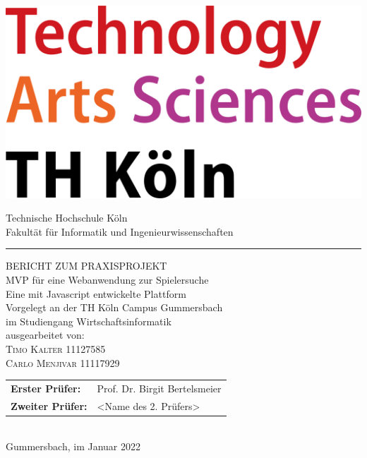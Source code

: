\documentclass[a4paper,12pt,oneside]{article}
\begin{document}
\pagestyle{empty} %
\newpage %

\pagestyle{empty}
\begin{titlepage}
  \includegraphics[scale=0.20]{sources/TH_Koeln_Logo}\\
  \begin{center}
    \Large
    Technische Hochschule Köln\\
    Fakultät für Informatik und Ingenieurwissenschaften\\
    \hrule\par\rule{0pt}{2cm}
    \LARGE
    \textsc{BERICHT ZUM PRAXISPROJEKT}\\
    \vspace{0.8cm}
    \huge
    MVP für eine Webanwendung zur Spielersuche\\ 
    \Large
    Eine mit Javascript entwickelte Plattform \\
    \vspace{0.8cm}
    \large
    Vorgelegt an der TH Köln Campus Gummersbach\\
    im Studiengang Wirtschaftsinformatik\\
    \vspace{0.8cm}
    ausgearbeitet von:\\
    \textsc{Timo Kalter} 11127585\\
    \textsc{Carlo Menjivar} 11117929\\
    \vspace{1cm}
    \begin{tabular}{ll} %
      \textbf{Erster Prüfer:}  & Prof. Dr. Birgit Bertelsmeier \\
      \textbf{Zweiter Prüfer:} & <Name des 2. Prüfers> \\
    \end{tabular}
    \vspace{0.5cm}
    \\Gummersbach, im Januar 2022
  \end{center}
\end{titlepage}
\end{document}
